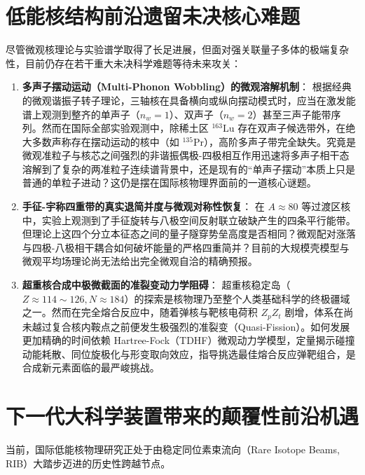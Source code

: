 \section{低能核结构前沿遗留未决核心难题}
\label{sec:unresolved_problems}

尽管微观核理论与实验谱学取得了长足进展，但面对强关联量子多体的极端复杂性，目前仍存在若干重大未决科学难题等待未来攻关：

\begin{enumerate}
    \item \textbf{多声子摆动运动（Multi-Phonon Wobbling）的微观溶解机制}：
    根据经典的微观谐振子转子理论，三轴核在具备横向或纵向摆动模式时，应当在激发能谱上观测到整齐的单声子（$n_w=1$）、双声子（$n_w=2$）甚至三声子能带序列。然而在国际全部实验观测中，除稀土区 $^{163}\text{Lu}$ 存在双声子候选带外，在绝大多数声称存在摆动运动的核中（如 $^{135}\text{Pr}$），高阶多声子带完全缺失。究竟是微观准粒子与核芯之间强烈的非谐振偶极-四极相互作用迅速将多声子相干态溶解到了复杂的两准粒子连续谱背景中，还是现有的“单声子摆动”本质上只是普通的单粒子进动？这仍是摆在国际核物理界面前的一道核心谜题。

    \item \textbf{手征-宇称四重带的真实退简并度与微观对称性恢复}：
    在 $A \approx 80$ 等过渡区核中，实验上观测到了手征旋转与八极空间反射联立破缺产生的四条平行能带。但理论上这四个分立本征态之间的量子隧穿势垒高度是否相同？微观配对涨落与四极-八极相干耦合如何破坏能量的严格四重简并？目前的大规模壳模型与微观平均场理论尚无法给出完全微观自洽的精确预报。

    \item \textbf{超重核合成中极微截面的准裂变动力学阻碍}：
    超重核稳定岛（$Z \approx 114 \sim 126, N \approx 184$）的探索是核物理乃至整个人类基础科学的终极疆域之一。然而在完全熔合反应中，随着弹核与靶核电荷积 $Z_p Z_t$ 剧增，体系在尚未越过复合核内鞍点之前便发生极强烈的准裂变（Quasi-Fission）。如何发展更加精确的时间依赖 Hartree-Fock（TDHF）微观动力学模型，定量揭示碰撞动能耗散、同位旋极化与形变取向效应，指导挑选最佳熔合反应弹靶组合，是合成新元素面临的最严峻挑战。
\end{enumerate}

\section{下一代大科学装置带来的颠覆性前沿机遇}
\label{sec:future_facilities}

当前，国际低能核物理研究正处于由稳定同位素束流向（Rare Isotope Beams, RIB）大踏步迈进的历史性跨越节点。

